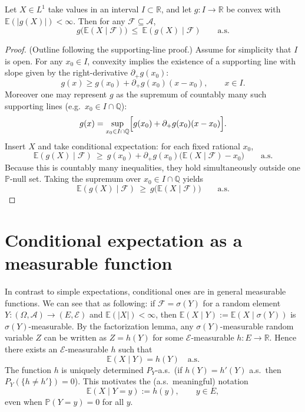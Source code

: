 \begin{theorem}
\label{thm:jensen}
Let $X\in L^1$ take values in an interval $I\subset\mathbb R$, and let $g:I\to\mathbb R$ be convex with
$\mathbb E(|g(X)|)<\infty$. Then for any $\mathcal F\subseteq\mathcal A$,
\[
g\bigl(\mathbb E(X\mid\mathcal F)\bigr)\ \le\ \mathbb E(g(X)\mid\mathcal F)\qquad \text{a.s.}
\]
\end{theorem}

\begin{proof}
(Outline following the supporting-line proof.) Assume for simplicity that $I$ is open.
For any $x_0\in I$, convexity implies the existence of a supporting line with slope given by the right-derivative $\partial_+g(x_0)$:
\[
g(x)\ge g(x_0)+\partial_+g(x_0)(x-x_0),\qquad x\in I.
\]
Moreover one may represent $g$ as the supremum of countably many such supporting lines (e.g.\ $x_0\in I\cap\mathbb Q$):
\[
g(x)=\sup_{x_0\in I\cap\mathbb Q}\Bigl[g(x_0)+\partial_+g(x_0)(x-x_0)\Bigr].
\]
Insert $X$ and take conditional expectation:
for each fixed rational $x_0$,
\[
\mathbb E(g(X)\mid\mathcal F)\ \ge\ g(x_0)+\partial_+g(x_0)\bigl(\mathbb E(X\mid\mathcal F)-x_0\bigr)\qquad \text{a.s.}
\]
Because this is countably many inequalities, they hold simultaneously outside one $\mathbb P$-null set.
Taking the supremum over $x_0\in I\cap\mathbb Q$ yields
\[
\mathbb E(g(X)\mid\mathcal F)\ \ge\ g\bigl(\mathbb E(X\mid\mathcal F)\bigr)\qquad \text{a.s.}
\]
\end{proof}

\section{Conditional expectation as a measurable function}

In contrast to simple expectations, conditional ones are in general measurable functions. We can see that as following: if $\mathcal F=\sigma(Y)$ for a random element $Y:(\Omega,\mathcal A)\to (E,\mathcal E)$ and $\mathbb E(|X|)<\infty$,
then $\mathbb E(X\mid Y):=\mathbb E(X\mid\sigma(Y))$ is $\sigma(Y)$-measurable.
By the factorization lemma, any $\sigma(Y)$-measurable random variable $Z$ can be written as $Z=h(Y)$ for some
$\mathcal E$-measurable $h:E\to\mathbb R$. Hence there exists an $\mathcal E$-measurable $h$ such that
\[
\mathbb E(X\mid Y)=h(Y)\quad\text{a.s.}
\]
The function $h$ is uniquely determined $P_Y$-a.s.\ (if $h(Y)=h'(Y)$ a.s.\ then $P_Y(\{h\ne h'\})=0$).
This motivates the (a.s.\ meaningful) notation
\[
\mathbb E(X\mid Y=y):=h(y),\qquad y\in E,
\]
even when $\mathbb P(Y=y)=0$ for all $y$. 

